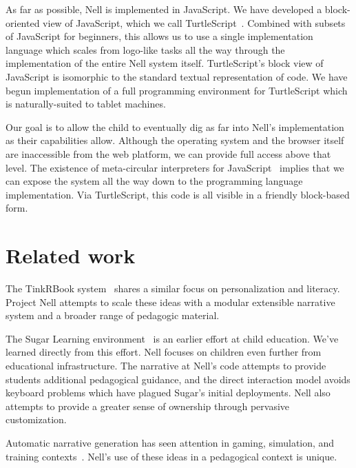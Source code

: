 \documentclass{acm_proc_article-sp}
\begin{document}
As far as possible, Nell is implemented in JavaScript.  We have
developed a block-oriented view of JavaScript, which we call
TurtleScript~\cite{turtlescript}.  Combined with subsets of JavaScript
for beginners, this allows us to use a single implementation language
which scales from logo-like tasks all the way through the
implementation of the entire Nell system itself.  TurtleScript's block
view of JavaScript is isomorphic to the standard textual
representation of code.  We have begun implementation of a full
programming environment for TurtleScript which is naturally-suited to
tablet machines.


Our goal is to allow the child to eventually dig as far into Nell's
implementation as their capabilities allow.  Although the operating system and
the browser itself are inaccessible from the web platform, we can
provide full access above that level.  The existence of meta-circular
interpreters for JavaScript~\cite{narcissus} implies that we can
expose the system all the way down to the programming language
implementation.  Via TurtleScript, this code is all visible in a
friendly block-based form.


\section{Related work}\label{sec:related}

The TinkRBook system~\cite{chang:tinkrbook} shares a similar focus on
personalization and literacy.  Project Nell attempts to scale these
ideas with a modular extensible narrative system and a broader range
of pedagogic material.

The Sugar Learning environment~\cite{sugarXXX} is an earlier effort at
child education.  We've learned directly from this effort.  Nell
focuses on children even further from educational infrastructure.
The narrative at Nell's code attempts to provide students additional
pedagogical guidance, and the direct interaction model avoids keyboard
problems which have plagued Sugar's initial deployments.  Nell also
attempts to provide a greater sense of ownership through pervasive
customization.

Automatic narrative generation has seen attention in
gaming, simulation, and training contexts~\cite{riedlXXX}.  Nell's
use of these ideas in a pedagogical context is unique.
\end{document}
